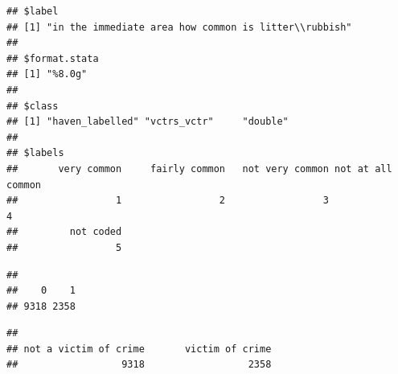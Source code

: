 \documentclass[
]{book}
\newenvironment{Shaded}{\begin{snugshade}}{\end{snugshade}}
\newcommand{\CommentTok}[1]{\textcolor[rgb]{0.56,0.35,0.01}{\textit{#1}}}
\newcommand{\FunctionTok}[1]{\textcolor[rgb]{0.00,0.00,0.00}{#1}}
\newcommand{\NormalTok}[1]{#1}
\newcommand{\SpecialCharTok}[1]{\textcolor[rgb]{0.00,0.00,0.00}{#1}}
\begin{document}
\begin{Shaded}
\end{Shaded}

\begin{verbatim}
## $label
## [1] "in the immediate area how common is litter\\rubbish"
## 
## $format.stata
## [1] "%8.0g"
## 
## $class
## [1] "haven_labelled" "vctrs_vctr"     "double"        
## 
## $labels
##       very common     fairly common   not very common not at all common 
##                 1                 2                 3                 4 
##         not coded 
##                 5
\end{verbatim}

\begin{Shaded}
\end{Shaded}

\begin{verbatim}
## 
##    0    1 
## 9318 2358
\end{verbatim}

\begin{Shaded}
\end{Shaded}

\begin{verbatim}
## 
## not a victim of crime       victim of crime 
##                  9318                  2358
\end{verbatim}

\begin{Shaded}
\end{Shaded}
\end{document}
